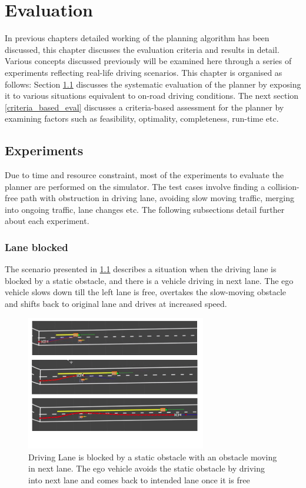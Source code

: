 \chapter{Evaluation}
\label{evaluation}
In previous chapters detailed working of the planning algorithm has been discussed, this chapter discusses the evaluation criteria and results in detail. Various concepts discussed previously will be examined here through a series of experiments reflecting real-life driving scenarios. This chapter is organised as follows: Section \ref{experiments} discusses the systematic evaluation of the planner by exposing it to various situations equivalent to on-road driving conditions. The next section \ref{criteria_based_eval} discusses a criteria-based assessment for the planner by examining factors such as feasibility, optimality, completeness, run-time etc.

\section{Experiments}\label{experiments}
Due to time and resource constraint, most of the experiments to evaluate the planner are performed on the simulator. The test cases involve finding a collision-free path with obstruction in driving lane, avoiding slow moving traffic, merging into ongoing traffic, lane changes etc. The following subsections detail further about each experiment. 

\subsection{Lane blocked}
The scenario presented in \ref{lane_blocked_1} describes a situation when the driving lane is blocked by a static obstacle, and there is a vehicle driving in next lane. The ego vehicle slows down till the left lane is free, overtakes the slow-moving obstacle and shifts back to original lane and drives at increased speed. 

\begin{figure}[h]
    \centering
    \includegraphics[width=0.7\textwidth]{Images/evaluation/2_lane_blocked.jpg}
    \caption{Driving Lane is blocked by a static obstacle with an obstacle moving in next lane. The ego vehicle avoids the static obstacle by driving into next lane and comes back to intended lane once it is free}
    \label{lane_blocked_1}
\end{figure}

